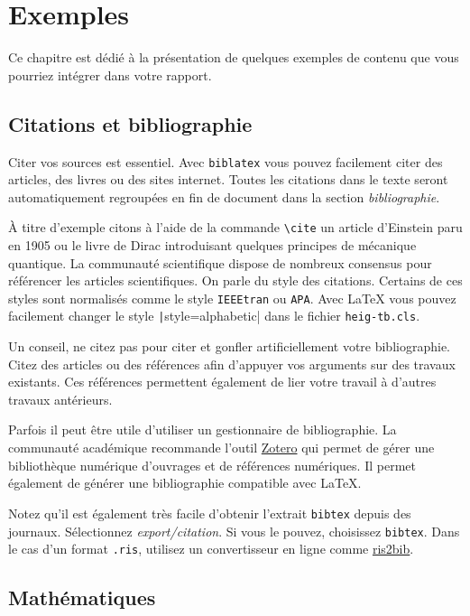 \chapter{Exemples}

Ce chapitre est dédié à la présentation de quelques exemples de contenu que vous pourriez intégrer dans votre rapport.

\section{Citations et bibliographie}

Citer vos sources est essentiel. Avec \texttt{biblatex} vous pouvez facilement citer des articles, des livres ou des sites internet. Toutes les citations dans le texte seront automatiquement regroupées en fin de document dans la section \emph{bibliographie}.

À titre d'exemple citons à l'aide de la commande \verb!\cite! un article d'Einstein \cite{texas_instruments_tad5212_2025} paru en 1905 ou le livre de Dirac \cite{texas_instruments_tad5212_2025} introduisant quelques principes de mécanique quantique. La communauté scientifique dispose de nombreux consensus pour référencer les articles scientifiques. On parle du style des citations. Certains de ces styles sont normalisés comme le style \texttt{IEEEtran} ou \texttt{APA}. Avec \LaTeX{} vous pouvez facilement changer le style \texttt|style=alphabetic| dans le fichier \texttt{heig-tb.cls}.

Un conseil, ne citez pas pour citer et gonfler artificiellement votre bibliographie. Citez des articles ou des références afin d'appuyer vos arguments sur des travaux existants. Ces références permettent également de lier votre travail à d'autres travaux antérieurs.

Parfois il peut être utile d'utiliser un gestionnaire de bibliographie. La communauté académique recommande l'outil \href{https://www.zotero.org/}{Zotero} qui permet de gérer une bibliothèque numérique d'ouvrages et de références numériques. Il permet également de générer une bibliographie compatible avec \LaTeX.

Notez qu'il est également très facile d'obtenir l'extrait \texttt{bibtex} depuis des journaux. Sélectionnez \emph{export/citation}. Si vous le pouvez, choisissez \texttt{bibtex}. Dans le cas d'un format \texttt{.ris}, utilisez un convertisseur en ligne comme \href{http://www.bruot.org/ris2bib/}{ris2bib}.

\section{Mathématiques}

